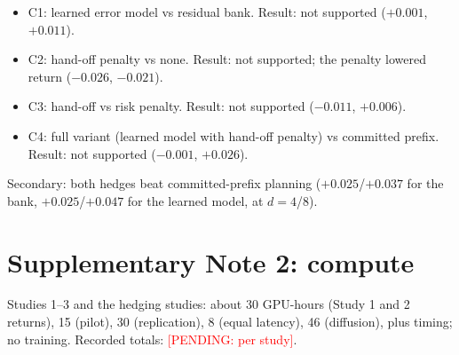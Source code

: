 \documentclass[pdflatex,sn-nature]{sn-jnl}
\newcommand{\pending}[1]{\textcolor{red}{[PENDING: #1]}}
\begin{document}
\begin{itemize}
\begin{itemize}
\item C1: learned error model vs residual bank. Result: not supported ($+0.001$, $+0.011$).
\item C2: hand-off penalty vs none. Result: not supported; the penalty lowered return ($-0.026$, $-0.021$).
\item C3: hand-off vs risk penalty. Result: not supported ($-0.011$, $+0.006$).
\item C4: full variant (learned model with hand-off penalty) vs committed prefix. Result: not supported ($-0.001$, $+0.026$).
\end{itemize}
Secondary: both hedges beat committed-prefix planning ($+0.025$/$+0.037$ for the bank, $+0.025$/$+0.047$ for the learned model, at $d=4$/$8$).
\end{itemize}

\section*{Supplementary Note 2: compute}
Studies 1--3 and the hedging studies: about 30 GPU-hours (Study 1 and 2 returns), 15 (pilot), 30 (replication), 8 (equal latency), 46 (diffusion), plus timing; no training. Recorded totals: \pending{per study}.
\end{document}
